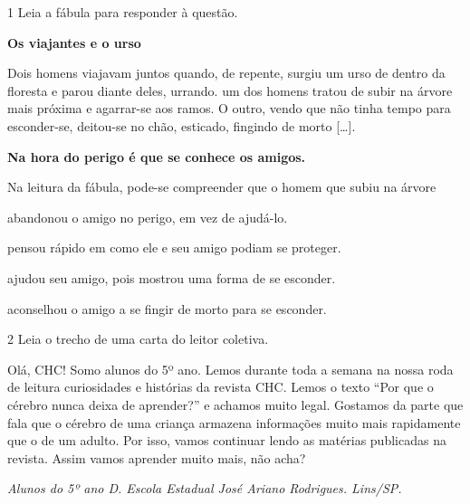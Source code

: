 \num{1} Leia a fábula para responder à questão.

\begin{myquote}
\textbf{Os viajantes e o urso}

Dois homens viajavam juntos quando, de repente, surgiu um urso de dentro
da floresta e parou diante deles, urrando. um dos homens tratou de subir
na árvore mais próxima e agarrar-se aos ramos. O outro, vendo que não
tinha tempo para esconder-se, deitou-se no chão, esticado, fingindo de
morto {[}\ldots{}{]}.

\textbf{Na hora do perigo é que se conhece os amigos.}

\end{myquote}

Na leitura da fábula, pode-se compreender que o homem que subiu na árvore

\begin{escolha}
\item abandonou o amigo no perigo, em vez de ajudá-lo.

\item pensou rápido em como ele e seu amigo podiam se proteger.

\item ajudou seu amigo, pois mostrou uma forma de se esconder.

\item aconselhou o amigo a se fingir de morto para se esconder.
\end{escolha}


\enlargethispage{\baselineskip}
\num{2} Leia o trecho de uma carta do leitor coletiva.

\begin{myquote}
Olá, CHC! Somo alunos do 5º ano. Lemos durante toda a semana na nossa
roda de leitura curiosidades e histórias da revista CHC. Lemos o texto
``Por que o cérebro nunca deixa de aprender?'' e achamos muito legal.
Gostamos da parte que fala que o cérebro de uma criança armazena
informações muito mais rapidamente que o de um adulto. Por isso, vamos
continuar lendo as matérias publicadas na revista. Assim vamos aprender
muito mais, não acha?

\begin{flushleft}
\textit{Alunos do 5º ano D. Escola Estadual José Ariano Rodrigues. Lins/SP.}
\end{flushleft}

\end{myquote}

